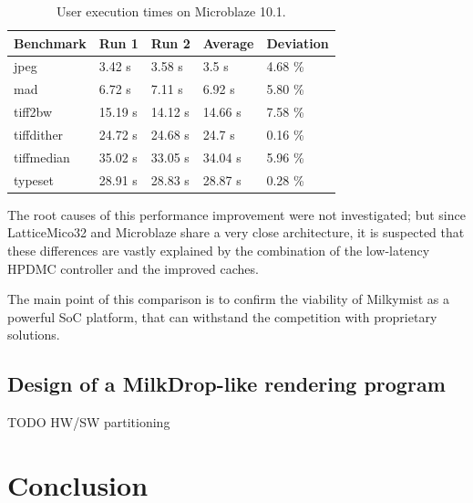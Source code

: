 \documentclass[a4paper,11pt]{kthesis}
\begin{document}
\begin{table}
\centering
\begin{tabular}{|l|l|l|l|l|}
\hline
\textbf{Benchmark} & \textbf{Run 1} & \textbf{Run 2} & \textbf{Average} & \textbf{Deviation}  \\
\hline
jpeg & 3.42 s & 3.58 s & 3.5 s & 4.68 \% \\
\hline
mad & 6.72 s & 7.11 s & 6.92 s & 5.80 \% \\
\hline
tiff2bw & 15.19 s & 14.12 s & 14.66 s & 7.58 \% \\
\hline
tiffdither & 24.72 s & 24.68 s & 24.7 s & 0.16 \% \\
\hline
tiffmedian & 35.02 s & 33.05 s & 34.04 s & 5.96 \% \\
\hline
typeset & 28.91 s & 28.83 s & 28.87 s & 0.28 \% \\
\hline
\end{tabular}
\label{tab:microblazespeed}
\caption{User execution times on Microblaze 10.1.}
\end{table}

The root causes of this performance improvement were not investigated; but since LatticeMico32 and Microblaze share a very close architecture, it is suspected that these differences are vastly explained by the combination of the low-latency HPDMC controller and the improved caches.

The main point of this comparison is to confirm the viability of Milkymist as a powerful SoC platform, that can withstand the competition with proprietary solutions.

\section{Design of a MilkDrop-like rendering program}
TODO HW/SW partitioning

\chapter{Conclusion}

{}

\end{document}
